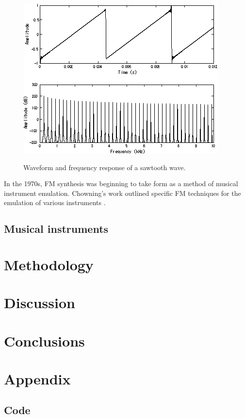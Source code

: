 \documentclass{article}
\begin{document}
        \begin{figure}[h]
            \includegraphics[scale=0.6]{images/Sawtooth.png}%
            \centering
            \caption{Waveform and frequency response of a sawtooth wave.}\cite{kraft2017lp}
        \end{figure}
        In the 1970s, FM synthesis was beginning to take form as a method of musical instrument emulation. Chowning's work outlined specific FM techniques for the emulation of various instruments \cite{chowning1973synthesis}.

    \subsection{Musical instruments}

\section{Methodology}
\section{Discussion}
\section{Conclusions}
\section{Appendix}
\subsection{Code}




\end{document}
